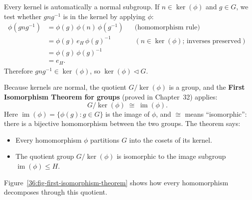 Every kernel is automatically a normal subgroup. If $n \in \ker(\phi)$ and $g \in G$, we test whether $gng^{-1}$ is in the kernel by applying $\phi$:
\begin{align*}
\phi(gng^{-1}) &= \phi(g)\,\phi(n)\,\phi(g^{-1}) && \text{(homomorphism rule)}\\
&= \phi(g)\, e_H\, \phi(g)^{-1} && (n \in \ker(\phi)\text{; inverses preserved})\\
&= \phi(g)\,\phi(g)^{-1}\\
&= e_H.
\end{align*}
Therefore $gng^{-1} \in \ker(\phi)$, so $\ker(\phi) \triangleleft G$.

Because kernels are normal, the quotient $G/\ker(\phi)$ is a group, and the \textbf{First Isomorphism Theorem for groups} (proved in Chapter~32) applies:
\[
G/\ker(\phi) \;\cong\; \operatorname{im}(\phi).
\]
Here $\operatorname{im}(\phi) = \{\phi(g) : g \in G\}$ is the image of $\phi$, and $\cong$ means ``isomorphic'': there is a bijective homomorphism between the two groups. The theorem says:
\begin{itemize}
  \item Every homomorphism $\phi$ partitions $G$ into the cosets of its kernel.
  \item The quotient group $G/\ker(\phi)$ is isomorphic to the image subgroup $\operatorname{im}(\phi) \le H$.
\end{itemize}

Figure~\ref{36:fig-first-isomorphism-theorem} shows how every homomorphism decomposes through this quotient.

